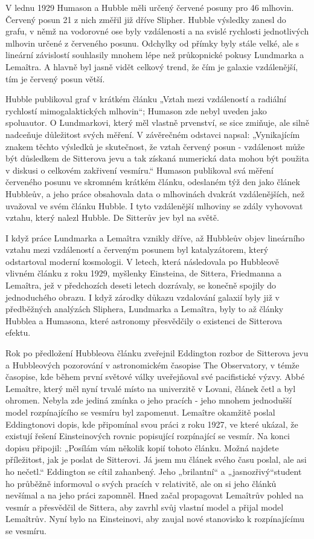   V lednu 1929 Humason a Hubble měli určený červené posuny pro 46 mlhovin. Červený posun 21 z nich
  změřil již dříve Slipher. Hubble výsledky zanesl do grafu, v němž na vodorovné ose byly
  vzdálenosti a na svislé rychlosti jednotlivých mlhovin určené z červeného posunu. Odchylky od
  přímky byly stále velké, ale s lineární závislostí souhlasily mnohem lépe než průkopnické pokusy
  Lundmarka a Lemaîtra. A hlavně byl jasně vidět celkový trend, že čím je galaxie vzdálenější, tím
  je červený posun větší. 
  
  Hubble publikoval graf v krátkém článku „Vztah mezi vzdáleností a radiální rychlostí
  mimogalaktických mlhovin“; Humason zde nebyl uveden jako spoluautor. O Lundmarkovi, který měl
  vlastně prvenství, se sice zmiňuje, ale silně nadceňuje důležitost svých měření. V závěrečném
  odstavci napsal: „Vynikajícím znakem těchto výsledků je skutečnost, že vztah červený posun -
  vzdálenost může být důsledkem de Sitterova jevu a tak získaná numerická data mohou být použita v
  diskusi o celkovém zakřivení vesmíru.“ Humason publikoval svá měření červeného posunu ve skromném
  krátkém článku, odeslaném týž den jako článek Hubbleův, a jeho práce obsahovala data o mlhovinách
  dvakrát vzdálenějších, než uvažoval ve svém článku Hubble. I tyto vzdálenější mlhoviny se zdály
  vyhovovat vztahu, který nalezl Hubble. De Sitterův jev byl na světě. 
  
  I když práce Lundmarka a Lemaîtra vznikly dříve, až Hubbleův objev lineárního vztahu mezi
  vzdáleností a červeným posunem byl katalyzátorem, který odstartoval moderní kosmologii. V letech,
  která následovala po Hubbleově vlivném článku z roku 1929, myšlenky Einsteina, de Sittera,
  Friedmanna a Lemaîtra, jež v předchozích deseti letech dozrávaly, se konečně spojily do
  jednoduchého obrazu. I když zárodky důkazu vzdalování galaxií byly již v předběžných analýzách
  Sliphera, Lundmarka a Lemaîtra, byly to až články Hubblea a Humasona, které astronomy přesvědčily
  o existenci de Sitterova efektu. 
  
  Rok po předložení Hubbleova článku zveřejnil Eddington rozbor de Sitterova jevu a Hubbleových
  pozorování v astronomickém časopise The Observatory, v témže časopise, kde během první světové
  války uveřejňoval své pacifistické výzvy. Abbé Lemaître, který měl nyní trvalé místo na univerzitě
  v Lovani, článek četl a byl ohromen. Nebyla zde jediná zmínka o jeho pracích - jeho mnohem
  jednodušší model rozpínajícího se vesmíru byl zapomenut. Lemaître okamžitě poslal Eddingtonovi
  dopis, kde připomínal svou práci z roku 1927, ve které ukázal, že existují řešení Einsteinových
  rovnic popisující rozpínající se vesmír. Na konci dopisu připojil: „Posílám vám několik kopií
  tohoto článku. Možná najdete příležitost, jak je poslat de Sitterovi. Já jsem mu článek svého času
  poslal, ale asi ho nečetl.“ Eddington se cítil zahanbený. Jeho „brilantní“ a „jasnozřivý“student
  ho průběžně informoval o svých pracích v relativitě, ale on si jeho článků nevšímal a na jeho
  práci zapomněl. Hned začal propagovat Lemaîtrův pohled na vesmír a přesvědčil de Sittera, aby
  zavrhl svůj vlastní model a přijal model Lemaîtrův. Nyní bylo na Einsteinovi, aby zaujal nové
  stanovisko k rozpínajícímu se vesmíru. 
  
